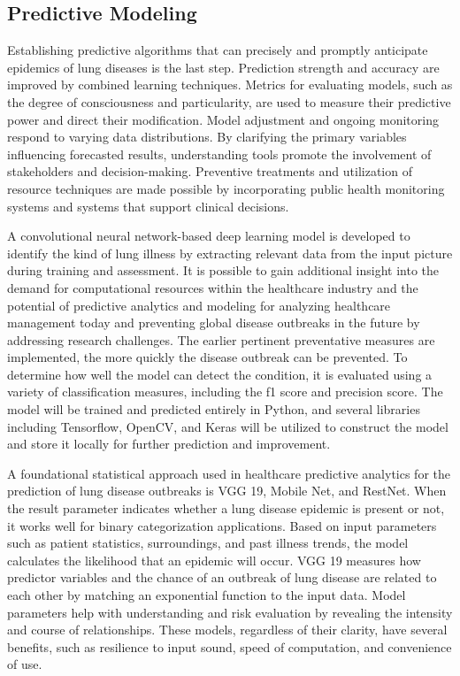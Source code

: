 \subsection {Predictive Modeling}
 Establishing predictive algorithms that can precisely and promptly anticipate epidemics of lung diseases is the last step. Prediction strength and accuracy are improved by combined learning techniques. Metrics for evaluating models, such as the degree of consciousness and particularity, are used to measure their predictive power and direct their modification. Model adjustment and ongoing monitoring respond to varying data distributions. By clarifying the primary variables influencing forecasted results, understanding tools promote the involvement of stakeholders and decision-making. Preventive treatments and utilization of resource techniques are made possible by incorporating public health monitoring systems and systems that support clinical decisions.

A convolutional neural network-based deep learning model is developed to identify the kind of lung illness by extracting relevant data from the input picture during training and assessment. It is possible to gain additional insight into the demand for computational resources within the healthcare industry and the potential of predictive analytics and modeling for analyzing healthcare management today and preventing global disease outbreaks in the future by addressing research challenges. The earlier pertinent preventative measures are implemented, the more quickly the disease outbreak can be prevented. To determine how well the model can detect the condition, it is evaluated using a variety of classification measures, including the f1 score and precision score. The model will be trained and predicted entirely in Python, and several libraries including Tensorflow, OpenCV, and Keras will be utilized to construct the model and store it locally for further prediction and improvement. 

A foundational statistical approach used in healthcare predictive analytics for the prediction of lung disease outbreaks is VGG 19, Mobile Net, and RestNet. When the result parameter indicates whether a lung disease epidemic is present or not, it works well for binary categorization applications. Based on input parameters such as patient statistics, surroundings, and past illness trends, the model calculates the likelihood that an epidemic will occur. VGG 19 measures how predictor variables and the chance of an outbreak of lung disease are related to each other by matching an exponential function to the input data. Model parameters help with understanding and risk evaluation by revealing the intensity and course of relationships. These models, regardless of their clarity, have several benefits, such as resilience to input sound, speed of computation, and convenience of use.

